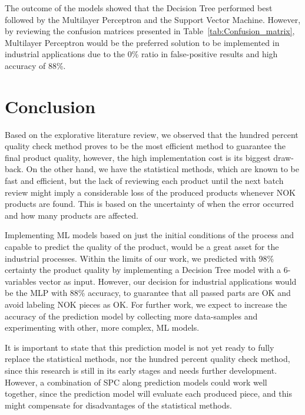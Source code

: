 \documentclass[5p,times,procedia]{elsarticle}
\begin{document}
The outcome of the models showed that the Decision Tree performed best followed by the Multilayer Perceptron and the Support Vector Machine. However, by reviewing the confusion matrices presented in Table~\ref{tab:Confusion_matrix}, Multilayer Perceptron would be the preferred solution to be implemented in industrial applications due to the 0\% ratio in false-positive results and high accuracy of 88\%.

\section{Conclusion} \label{sec:conclusion}


Based on the explorative literature review, we observed that the hundred percent quality check method proves to be the most efficient method to guarantee the final product quality, however, the high implementation cost is its biggest draw-back. On the other hand, we have the statistical methods, which are known to be fast and efficient, but the lack of reviewing each product until the next batch review might imply a considerable loss of the produced products whenever NOK products are found. This is based on the uncertainty of when the error occurred and how many products are affected.

Implementing ML models based on just the initial conditions of the process and capable to predict the quality of the product, would be a great asset for the industrial processes. Within the limits of our work, we predicted with 98\% certainty the product quality by implementing a Decision Tree model with a 6-variables vector as input. 
However, our decision for industrial applications would be the MLP with 88\% accuracy, to guarantee that all passed parts are OK and avoid labeling NOK pieces as OK. For further work, we expect to increase the accuracy of the prediction model by collecting more data-samples and experimenting with other, more complex, ML models.

It is important to state that this prediction model is not yet ready to fully replace the statistical methods, nor the hundred percent quality check method, since this research is still in its early stages and needs further development. However, a combination of SPC along prediction models could work well together, since the prediction model will evaluate each produced piece, and this might compensate for disadvantages of the statistical methods.
\end{document}
